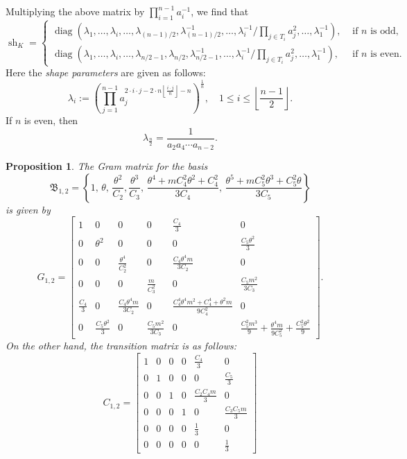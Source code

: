 \documentclass[table]{amsart}
\newtheorem{proposition}[theorem]{Proposition}
\newcommand{\op}[1]{\operatorname{#1}}
\numberwithin{equation}{section}
\begin{document}
\noindent Multiplying the above matrix by $\prod_{i=1}^{n-1} a_i^{-1}$, we find that 
\[\op{sh}_K=\begin{cases} \op{diag}\left(\lambda_1, \dots, \lambda_i, \dots, \lambda_{(n-1)/2}, \lambda_{(n-1)/2}^{-1}, \dots, \lambda_{i}^{-1}/\prod\limits_{j\in T_i}a_j^2, \dots, \lambda_1^{-1}\right), &\text{ if }n\text{ is odd,}\\[5mm]
\op{diag}\left(\lambda_1, \dots, \lambda_i, \dots,\lambda_{n/2-1}, \lambda_{n/2},\lambda_{n/2-1}^{-1}, \dots, \lambda_{i}^{-1}/\prod\limits_{j\in T_i}a_j^2, \dots, \lambda_1^{-1}\right), &\text{ if }n\text{ is even.}
\end{cases}\]
Here the \emph{shape parameters} are given as follows:
$$\lambda_i:= \left( \prod\limits_{j=1}^{n-1} a_j^{2\cdot i\cdot j -2\cdot n\left\lfloor \frac{i\cdot j}{n}\right\rfloor - n} \right)^{\frac{1}{n}},\quad 1\leq i\leq \left\lfloor\frac{n-1}{2}\right\rfloor.$$
If $n$ is even, then $$\lambda_{\frac{n}{2}} = \frac{1}{a_2a_4\cdots a_{n-2}
}.$$

\begin{proposition}
The Gram matrix for the basis
\[
\mathfrak{B}_{1,2}=\left\{1,\, \theta,\, \frac{\theta^2}{C_2}, \frac{\theta^3}{C_3},\, \frac{\theta^4+mC_4^2\theta^2+C_4^2}{3C_4},\, \frac{\theta^5 + m C_5^2 \theta^3 + C_5^2 \theta}{3 C_5} \right\}
\]
is given by
\[
G_{1,2}=\begin{bmatrix}
1 & 0 & 0 & 0 & \tfrac{C_4}{3} & 0 \\[8pt]
0 & \theta^2 & 0 & 0 & 0 & \tfrac{C_5 \theta^2}{3 } \\[8pt]
0 & 0 & \tfrac{\theta^4}{C_2^2} & 0 & \tfrac{C_4 \theta^4 m}{3 C_2} & 0 \\[8pt]
0 & 0 & 0 & \tfrac{m}{C_3^2} & 0 & \tfrac{C_5 m^2}{3 C_3} \\[8pt]
\tfrac{C_4}{3} & 0 & \tfrac{C_4 \theta^4 m}{3 C_2} & 0 & \tfrac{C_4^4 \theta^4 m^2 + C_4^4 + \theta^2 m}{9 C_4^2} & 0 \\[8pt]
0 & \tfrac{C_5 \theta^2}{3 } & 0 & \tfrac{C_5 m^2}{3 C_3} & 0 & \tfrac{C_5^2 m^3}{9} + \tfrac{\theta^4 m}{9 C_5^2} + \tfrac{C_5^2 \theta^2}{9 }
\end{bmatrix}.
\]
On the other hand, the transition matrix is as follows:
\[
C_{1,2} = 
\begin{bmatrix}
1 & 0 & 0 & 0 & \tfrac{C_4}{3} & 0 \\[8pt]
0 & 1 & 0 & 0 & 0 & \tfrac{C_5}{3} \\[8pt]
0 & 0 & 1 & 0 & \tfrac{C_2 C_4 m}{3} & 0 \\[8pt]
0 & 0 & 0 & 1 & 0 & \tfrac{C_3 C_5 m}{3} \\[8pt]
0 & 0 & 0 & 0 & \tfrac{1}{3} & 0 \\[8pt]
0 & 0 & 0 & 0 & 0 & \tfrac{1}{3}
\end{bmatrix}
\]
\end{proposition}
\end{document}
